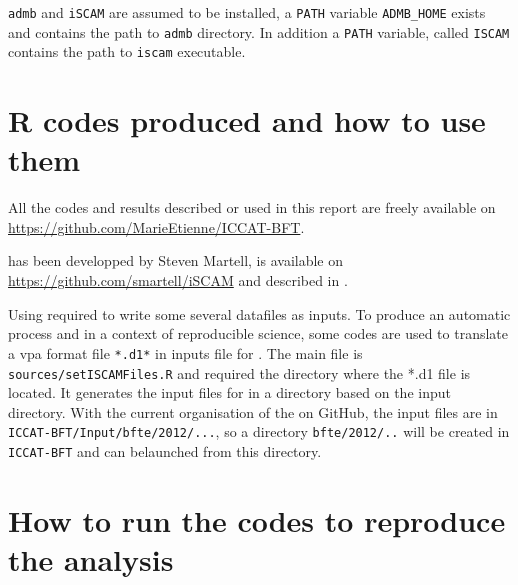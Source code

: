 \verb+admb+ and \verb+iSCAM+ are assumed to be installed, a \verb+PATH+ variable \verb+ADMB_HOME+ exists and contains the path to \verb+admb+ directory. In addition a \verb+PATH+ variable, called \verb+ISCAM+ contains the path to \verb+iscam+ executable.   
\section{R codes produced and how to use them}
All the codes and results described  or used in this report are freely
available on \url{https://github.com/MarieEtienne/ICCAT-BFT}. 

\iscam  has  been  developped  by  Steven  Martell,  is  available  on
\url{https://github.com/smartell/iSCAM} and described in \cite{Martell11}.

Using \iscam  required to write  some several datafiles as  inputs. To
produce an automatic process and in a context of reproducible science,
some \rcode codes  are used to translate a vpa  format file \verb+*.d1*+ in
inputs     file      for     \iscam.     The     main      file     is
\verb+sources/setISCAMFiles.R+  and required  the directory  where the
*.d1 file  is located. It  generates the input  files for \iscam  in a
directory based on the input  directory. With the current organisation
of the on GitHub, the input files are in \verb+ICCAT-BFT/Input/bfte/2012/...+, so
a directory  \verb+bfte/2012/..+ will  be created  in \verb+ICCAT-BFT+
and \iscam can belaunched from this directory.

\section{How to run the codes to reproduce the analysis}
